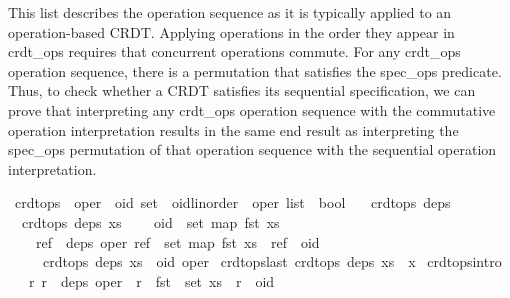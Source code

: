 \begin{isabellebody}
\begin{isamarkuptext}
This list describes the operation sequence as it is typically applied to an
operation-based CRDT. Applying operations in the order they appear in
crdt\_ops requires that concurrent operations commute. For any crdt\_ops
operation sequence, there is a permutation that satisfies the spec\_ops
predicate. Thus, to check whether a CRDT satisfies its sequential specification,
we can prove that interpreting any crdt\_ops operation sequence with the
commutative operation interpretation results in the same end result as
interpreting the spec\_ops permutation of that operation sequence with the
sequential operation interpretation.%
\end{isamarkuptext}\isamarkuptrue%
\isamarkupfalse%
\ crdt{\isacharunderscore}ops\ {\isacharcolon}{\isacharcolon}\ {\isachardoublequoteopen}{\isacharparenleft}{\isacharprime}oper\ {\isasymRightarrow}\ {\isacharprime}oid\ set{\isacharparenright}\ {\isasymRightarrow}\ {\isacharparenleft}{\isacharprime}oid{\isacharcolon}{\isacharcolon}{\isacharbraceleft}linorder{\isacharbraceright}\ {\isasymtimes}\ {\isacharprime}oper{\isacharparenright}\ list\ {\isasymRightarrow}\ bool{\isachardoublequoteclose}\ \isanewline
\ \ {\isachardoublequoteopen}crdt{\isacharunderscore}ops\ deps\ {\isacharbrackleft}{\isacharbrackright}{\isachardoublequoteclose}\ {\isacharbar}\isanewline
\ \ {\isachardoublequoteopen}{\isasymlbrakk}crdt{\isacharunderscore}ops\ deps\ xs{\isacharsemicolon}\isanewline
\ \ \ \ oid\ {\isasymnotin}\ set\ {\isacharparenleft}map\ fst\ xs{\isacharparenright}{\isacharsemicolon}\isanewline
\ \ \ \ {\isasymforall}ref\ {\isasymin}\ deps\ oper{\isachardot}\ ref\ {\isasymin}\ set\ {\isacharparenleft}map\ fst\ xs{\isacharparenright}\ {\isasymand}\ ref\ {\isacharless}\ oid\isanewline
\ \ \ {\isasymrbrakk}\ {\isasymLongrightarrow}\ crdt{\isacharunderscore}ops\ deps\ {\isacharparenleft}xs\ {\isacharat}\ {\isacharbrackleft}{\isacharparenleft}oid{\isacharcomma}\ oper{\isacharparenright}{\isacharbrackright}{\isacharparenright}{\isachardoublequoteclose}\isanewline
\isanewline
{}\isamarkupfalse%
\ crdt{\isacharunderscore}ops{\isacharunderscore}last{\isacharcolon}\ {\isachardoublequoteopen}crdt{\isacharunderscore}ops\ deps\ {\isacharparenleft}xs\ {\isacharat}\ {\isacharbrackleft}x{\isacharbrackright}{\isacharparenright}{\isachardoublequoteclose}\isanewline
\isanewline
{}\isamarkupfalse%
\ crdt{\isacharunderscore}ops{\isacharunderscore}intro{\isacharcolon}\isanewline
\ \ \ {\isachardoublequoteopen}{\isasymAnd}r{\isachardot}\ r\ {\isasymin}\ deps\ oper\ {\isasymLongrightarrow}\ r\ {\isasymin}\ fst\ {\isacharbackquote}\ set\ xs\ {\isasymand}\ r\ {\isacharless}\ oid{\isachardoublequoteclose}\isanewline

\end{isabellebody}
